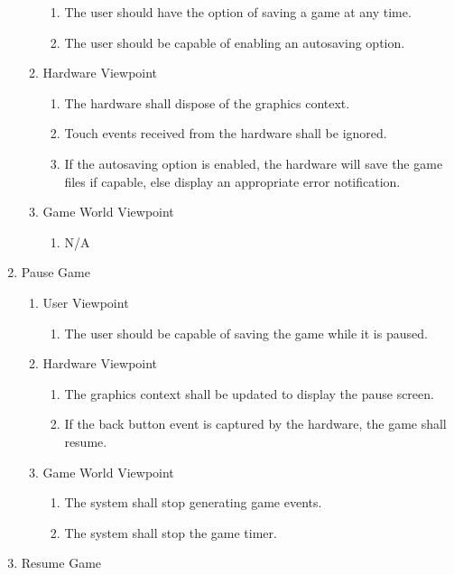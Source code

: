 \documentclass[]{article}
\begin{document}
\begin{enumerate}[{BE}1.]
\begin{enumerate}[{VP2}.1]
\begin{enumerate}
				\item The user should have the option of saving a game at any time.
				\item The user should be capable of enabling an autosaving option.
			\end{enumerate}
		\item Hardware Viewpoint
			\begin{enumerate}
				\item The hardware shall dispose of the graphics context.
				\item Touch events received from the hardware shall be ignored.
				\item If the autosaving option is enabled, the hardware will save the game files if capable, else display an appropriate error notification.
			\end{enumerate}
		\item Game World Viewpoint
			\begin{enumerate}
				\item N/A
			\end{enumerate}
	\end{enumerate}
		\item Pause Game
	\begin{enumerate}[{VP3}.1]
		\item User Viewpoint
			\begin{enumerate}
				\item The user should be capable of saving the game while it is paused.
			\end{enumerate}
		\item Hardware Viewpoint
			\begin{enumerate}
				\item The graphics context shall be updated to display the pause screen.
				\item If the back button event is captured by the hardware, the game shall resume.
			\end{enumerate}
		\item Game World Viewpoint
			\begin{enumerate}
				\item The system shall stop generating game events.
				\item The system shall stop the game timer.
			\end{enumerate}
	\end{enumerate}
		\item Resume Game

\end{enumerate}
\end{document}
